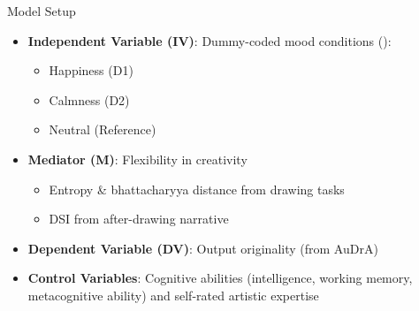 \documentclass[pdf]{beamer}
\begin{document}
\begin{frame}{Model Setup}
    \begin{itemize}
        \item<1-> \textbf{Independent Variable (IV)}: Dummy-coded mood conditions (\cite{hayes_statistical_2014}):
        \begin{itemize}
            \item Happiness (D1)
            \item Calmness (D2)
            \item Neutral (Reference)
        \end{itemize}
        \item<2-> \textbf{Mediator (M)}: Flexibility in creativity
        \begin{itemize}
            \item Entropy \& bhattacharyya distance from drawing tasks
            \item DSI from after-drawing narrative
        \end{itemize}
        \item<3-> \textbf{Dependent Variable (DV)}: Output originality (from AuDrA)
        \item<4-> \textbf{Control Variables}: Cognitive abilities (intelligence, working memory, metacognitive ability) and self-rated artistic expertise
\end{itemize}
\end{frame}

\end{document}
